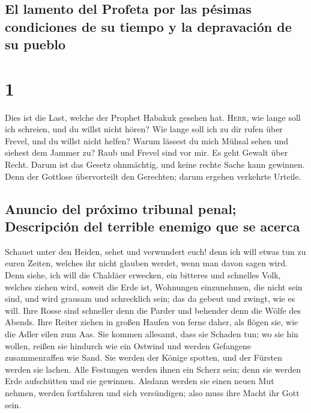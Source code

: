 \hypertarget{el-lamento-del-profeta-por-las-puxe9simas-condiciones-de-su-tiempo-y-la-depravaciuxf3n-de-su-pueblo}{%
\subsection{El lamento del Profeta por las pésimas condiciones de su
tiempo y la depravación de su
pueblo}\label{el-lamento-del-profeta-por-las-puxe9simas-condiciones-de-su-tiempo-y-la-depravaciuxf3n-de-su-pueblo}}

\hypertarget{section}{%
\section{1}\label{section}}

 Dies ist die Last, welche der Prophet Habakuk gesehen
hat.  \textsc{Herr}, wie lange soll ich schreien, und du
willst nicht hören? Wie lange soll ich zu dir rufen über Frevel, und du
willst nicht helfen?  Warum lässest du mich Mühsal sehen
und siehest dem Jammer zu? Raub und Frevel sind vor mir. Es geht Gewalt
über Recht.  Darum ist das Gesetz ohnmächtig, und keine
rechte Sache kann gewinnen. Denn der Gottlose übervorteilt den
Gerechten; darum ergehen verkehrte Urteile.

\hypertarget{anuncio-del-pruxf3ximo-tribunal-penal-descripciuxf3n-del-terrible-enemigo-que-se-acerca}{%
\subsection{Anuncio del próximo tribunal penal; Descripción del terrible
enemigo que se
acerca}\label{anuncio-del-pruxf3ximo-tribunal-penal-descripciuxf3n-del-terrible-enemigo-que-se-acerca}}

 Schauet unter den Heiden, sehet und verwundert euch! denn
ich will etwas tun zu euren Zeiten, welches ihr nicht glauben werdet,
wenn man davon sagen wird.  Denn siehe, ich will die
Chaldäer erwecken, ein bitteres und schnelles Volk, welches ziehen wird,
soweit die Erde ist, Wohnungen einzunehmen, die nicht sein sind,
 und wird grausam und schrecklich sein; das da gebeut und
zwingt, wie es will.  Ihre Rosse sind schneller denn die
Parder und behender denn die Wölfe des Abends. Ihre Reiter ziehen in
großen Haufen von ferne daher, als flögen sie, wie die Adler eilen zum
Aas.  Sie kommen allesamt, dass sie Schaden tun; wo sie
hin wollen, reißen sie hindurch wie ein Ostwind und werden Gefangene
zusammenraffen wie Sand.  Sie werden der Könige spotten,
und der Fürsten werden sie lachen. Alle Festungen werden ihnen ein
Scherz sein; denn sie werden Erde aufschütten und sie gewinnen.
 Alsdann werden sie einen neuen Mut nehmen, werden
fortfahren und sich versündigen; also muss ihre Macht ihr Gott sein.

